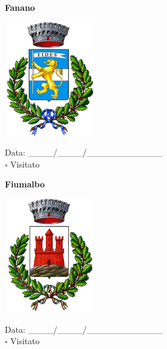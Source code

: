 \documentclass[a5paper,12pt]{article}
\begin{document}
\newpage

\noindent
\begin{minipage}[t]{0.45\textwidth}
    \begin{center}
        \textbf{Fanano}
    \end{center}
    \vspace{-0.5cm} %
    \begin{center}
        \includegraphics[height= 5cm, width=4cm]{Emilia Romagna/Stemma Fanano.png}
    \end{center}
    \vspace{-0.4cm} %
    \begin{flushleft}
        Data: \_\_\_\_/\_\_\_\_/\_\_\_\_\_\_\_\_\_\_\_\_ \\
        $\square$ Visitato
    \end{flushleft}
\end{minipage}
\hfill
\noindent
\begin{minipage}[t]{0.45\textwidth}
    \begin{center}
        \textbf{Fiumalbo}
    \end{center}
    \vspace{-0.5cm} %
    \begin{center}
        \includegraphics[height= 5cm, width=4cm]{Emilia Romagna/Stemma Fiumalbo.png}
    \end{center}
    \vspace{-0.4cm} %
    \begin{flushleft}
        Data: \_\_\_\_/\_\_\_\_/\_\_\_\_\_\_\_\_\_\_\_\_ \\
        $\square$ Visitato
    \end{flushleft}
\end{minipage}
\end{document}
